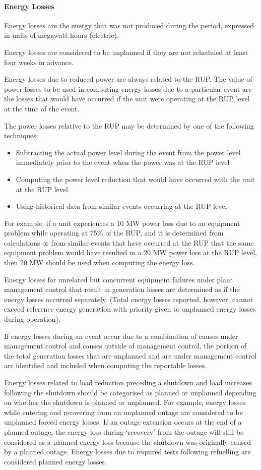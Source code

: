 \paragraph{Energy Losses}
Energy losses are the energy that was not produced during the period,
expressed in units of megawatt-hours (electric).

Energy losses are considered to be unplanned if they are not scheduled
at least four weeks in advance.

Energy losses due to reduced power are always related to the RUP. The
value of power losses to be used in computing energy losses due to a
particular event are the losses that would have occurred if the unit
were operating at the RUP level at the time of the event.

The power losses relative to the RUP may be determined by one of the
following techniques:
\begin{itemize}
\item Subtracting the actual power level during the event from the power level immediately prior to the event when the power was at the RUP level
\item Computing the power level reduction that would have occurred with the unit at the RUP level
\item Using historical data from similar events occurring at the RUP
  level
\end{itemize}

For example, if a unit experiences a 10 MW power loss due to an
equipment problem while operating at 75\% of the RUP, and it is
determined from calculations or from similar events that have occurred
at the RUP that the same equipment problem would have resulted in a 20
MW power loss at the RUP level, then 20 MW should be used when
computing the energy loss.

Energy losses for unrelated but concurrent equipment failures under
plant management control that result in generation losses are
determined as if the energy losses occurred separately. (Total energy
losses reported, however, cannot exceed reference energy generation
with priority given to unplanned energy losses during operation).

If energy losses during an event occur due to a combination of causes
under management control and causes outside of management control, the
portion of the total generation losses that are unplanned and are
under management control are identified and included when computing
the reportable losses.

Energy losses related to load reduction preceding a shutdown and load
increases following the shutdown should be categorised as planned or
unplanned depending on whether the shutdown is planned or
unplanned. For example, energy losses while entering and recovering
from an unplanned outage are considered to be unplanned forced energy
losses. If an outage extension occurs at the end of a planned outage,
the energy loss during ‘recovery’ from the outage will still be
considered as a planned energy loss because the shutdown was
originally caused by a planned outage. Energy losses due to required
tests following refuelling are considered planned energy losses.

